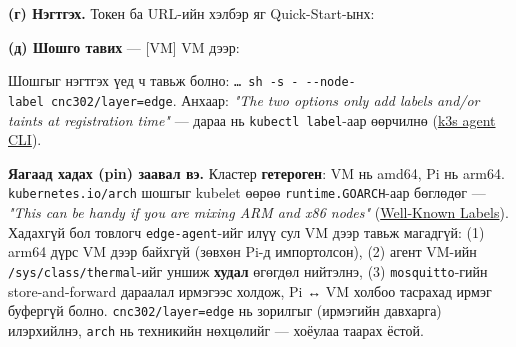 \textbf{(г) Нэгтгэх.} Токен ба URL-ийн хэлбэр яг Quick-Start-ынх:

\begin{Shaded}
\begin{Highlighting}[]
\KeywordTok{|} \OperatorTok{\textless{}}\OperatorTok{\textgreater{}}\OperatorTok{\textless{}}\OperatorTok{\textgreater{}}
\KeywordTok{|} 
\end{Highlighting}
\end{Shaded}

\textbf{(д) Шошго тавих} --- {[}VM{]} VM дээр:

\begin{Shaded}
\begin{Highlighting}[]
\OperatorTok{\textless{}}\OperatorTok{\textgreater{}}
\end{Highlighting}
\end{Shaded}

Шошгыг нэгтгэх үед ч тавьж болно: \texttt{\ldots{}\ sh\ -s\ -\ -\/\allowbreak{}-node-label\ cnc302/\allowbreak{}layer=\allowbreak{}edge}. Анхаар: \emph{"The two options only add labels and/or taints at registration time"} --- дараа нь \texttt{kubectl\ label}-аар өөрчилнө (\href{https://docs.k3s.io/cli/agent}{k3s agent CLI}).

\textbf{Яагаад хадах (pin) заавал вэ.} Кластер \textbf{гетероген}: VM нь amd64, Pi нь arm64. \texttt{kubernetes.\allowbreak{}io/\allowbreak{}arch} шошгыг kubelet өөрөө \texttt{runtime.GOARCH}-аар бөглөдөг --- \emph{"This can be handy if you are mixing ARM and x86 nodes"} (\href{https://kubernetes.io/docs/reference/labels-annotations-taints/}{Well-Known Labels}). Хадахгүй бол товлогч \texttt{edge-agent}-ийг илүү сул VM дээр тавьж магадгүй: (1) arm64 дүрс VM дээр байхгүй (зөвхөн Pi-д импортолсон), (2) агент VM-ийн \texttt{/\allowbreak{}sys/\allowbreak{}class/\allowbreak{}thermal}-ийг уншиж \textbf{худал} өгөгдөл нийтэлнэ, (3) \texttt{mosquitto}-гийн store-and-forward дараалал ирмэгээс холдож, Pi ↔ VM холбоо тасрахад ирмэг буфергүй болно. \texttt{cnc302/\allowbreak{}layer=\allowbreak{}edge} нь зорилгыг (ирмэгийн давхарга) илэрхийлнэ, \texttt{arch} нь техникийн нөхцөлийг --- хоёулаа таарах ёстой.

